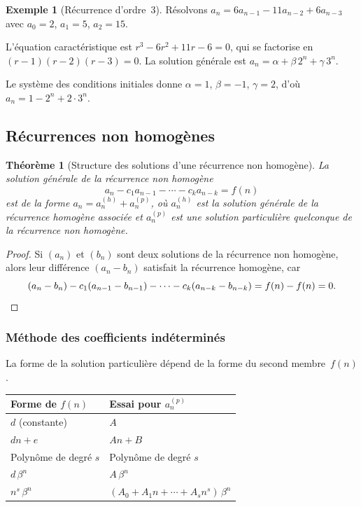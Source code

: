 \documentclass[12pt,a4paper,openany]{book}
\theoremstyle{definition}
\newtheorem{exemple}[definition]{Exemple}
\theoremstyle{plain}
\newtheorem{theoreme}[definition]{Théorème}
\theoremstyle{remark}
\begin{document}
\begin{exemple}[Récurrence d'ordre~3]
\label{ex:rec-ordre3}
Résolvons $a_n = 6a_{n-1} - 11a_{n-2} + 6a_{n-3}$ avec $a_0 = 2$,
$a_1 = 5$, $a_2 = 15$.

L'équation caractéristique est $r^3 - 6r^2 + 11r - 6 = 0$, qui se factorise
en $(r-1)(r-2)(r-3) = 0$. La solution générale est
$a_n = \alpha + \beta\, 2^n + \gamma\, 3^n$.

Le système des conditions initiales donne $\alpha = 1$, $\beta = -1$,
$\gamma = 2$, d'où $a_n = 1 - 2^n + 2 \cdot 3^n$.
\end{exemple}

\subsection{Récurrences non homogènes}
\label{subsec:rec-non-hom}

\begin{theoreme}[Structure des solutions d'une récurrence non homogène]
\label{thm:structure-non-hom}
La solution générale de la récurrence non homogène
\[
  a_n - c_1 a_{n-1} - \cdots - c_k a_{n-k} = f(n)
\]
est de la forme $a_n = a_n^{(h)} + a_n^{(p)}$, où $a_n^{(h)}$ est la solution
générale de la récurrence homogène associée et $a_n^{(p)}$ est une solution
particulière quelconque de la récurrence non homogène.
\end{theoreme}

\begin{proof}
Si $(a_n)$ et $(b_n)$ sont deux solutions de la récurrence non homogène, alors
leur différence $(a_n - b_n)$ satisfait la récurrence homogène, car
\[
  (a_n - b_n) - c_1(a_{n-1} - b_{n-1}) - \cdots - c_k(a_{n-k} - b_{n-k})
  = f(n) - f(n) = 0. \qedhere
\]
\end{proof}

\subsubsection{Méthode des coefficients indéterminés}
\label{subsubsec:coeff-indet}

La forme de la solution particulière dépend de la forme du second membre~$f(n)$.

\begin{center}
\renewcommand{\arraystretch}{1.4}
\begin{tabular}{@{}ll@{}}
\toprule
\textbf{Forme de $f(n)$} & \textbf{Essai pour $a_n^{(p)}$} \\
\midrule
$d$ (constante) & $A$ \\
$dn + e$ & $An + B$ \\
Polynôme de degré $s$ & Polynôme de degré $s$ \\
$d\, \beta^n$ & $A\, \beta^n$ \\
$n^s \, \beta^n$ & $(A_0 + A_1 n + \cdots + A_s n^s)\, \beta^n$ \\
\bottomrule
\end{tabular}
\end{center}
\end{document}
